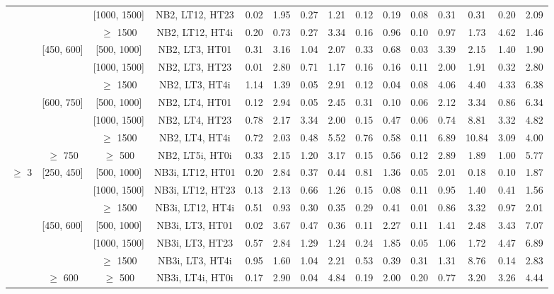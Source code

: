 \begin{table}[ht]
\begin{center}
\begin{tabular}{|c | c | c | c | c | c | c | c | c | c | c | c | c | c | c | }
\cline{3-15}  & & [1000, 1500] &NB2, LT12, HT23 & 0.02 & 1.95 & 0.27 & 1.21 & 0.12 & 0.19 & 0.08 & 0.31 & 0.31 & 0.20 & 2.09 \\ 
\cline{3-15}  & & $\geq$ 1500 &NB2, LT12, HT4i & 0.20 & 0.73 & 0.27 & 3.34 & 0.16 & 0.96 & 0.10 & 0.97 & 1.73 & 4.62 & 1.46 \\ 
\cline{2-15}   & [450, 600] & [500, 1000]&NB2, LT3, HT01 & 0.31 & 3.16 & 1.04 & 2.07 & 0.33 & 0.68 & 0.03 & 3.39 & 2.15 & 1.40 & 1.90 \\ 
\cline{3-15}  & & [1000, 1500] &NB2, LT3, HT23 & 0.01 & 2.80 & 0.71 & 1.17 & 0.16 & 0.16 & 0.11 & 2.00 & 1.91 & 0.32 & 2.80 \\ 
\cline{3-15}  & & $\geq$ 1500 &NB2, LT3, HT4i & 1.14 & 1.39 & 0.05 & 2.91 & 0.12 & 0.04 & 0.08 & 4.06 & 4.40 & 4.33 & 6.38 \\ 
\cline{2-15}   & [600, 750] & [500, 1000]&NB2, LT4, HT01 & 0.12 & 2.94 & 0.05 & 2.45 & 0.31 & 0.10 & 0.06 & 2.12 & 3.34 & 0.86 & 6.34 \\ 
\cline{3-15}  & & [1000, 1500] &NB2, LT4, HT23 & 0.78 & 2.17 & 3.34 & 2.00 & 0.15 & 0.47 & 0.06 & 0.74 & 8.81 & 3.32 & 4.82 \\ 
\cline{3-15}  & & $\geq$ 1500 &NB2, LT4, HT4i & 0.72 & 2.03 & 0.48 & 5.52 & 0.76 & 0.58 & 0.11 & 6.89 & 10.84 & 3.09 & 4.00 \\ 
\cline{2-15}   & $\geq$ 750 & $\geq$ 500&NB2, LT5i, HT0i & 0.33 & 2.15 & 1.20 & 3.17 & 0.15 & 0.56 & 0.12 & 2.89 & 1.89 & 1.00 & 5.77 \\ 
\cline{1-15} $\geq$ 3 & [250, 450] & [500, 1000]&NB3i, LT12, HT01 & 0.20 & 2.84 & 0.37 & 0.44 & 0.81 & 1.36 & 0.05 & 2.01 & 0.18 & 0.10 & 1.87 \\ 
\cline{3-15}  & & [1000, 1500] &NB3i, LT12, HT23 & 0.13 & 2.13 & 0.66 & 1.26 & 0.15 & 0.08 & 0.11 & 0.95 & 1.40 & 0.41 & 1.56 \\ 
\cline{3-15}  & & $\geq$ 1500 &NB3i, LT12, HT4i & 0.51 & 0.93 & 0.30 & 0.35 & 0.29 & 0.41 & 0.01 & 0.86 & 3.32 & 0.97 & 2.01 \\ 
\cline{2-15}   & [450, 600] & [500, 1000]&NB3i, LT3, HT01 & 0.02 & 3.67 & 0.47 & 0.36 & 0.11 & 2.27 & 0.11 & 1.41 & 2.48 & 3.43 & 7.07 \\ 
\cline{3-15}  & & [1000, 1500] &NB3i, LT3, HT23 & 0.57 & 2.84 & 1.29 & 1.24 & 0.24 & 1.85 & 0.05 & 1.06 & 1.72 & 4.47 & 6.89 \\ 
\cline{3-15}  & & $\geq$ 1500 &NB3i, LT3, HT4i & 0.95 & 1.60 & 1.04 & 2.21 & 0.53 & 0.39 & 0.31 & 1.31 & 8.76 & 0.14 & 2.83 \\ 
\cline{2-15}   & $\geq$ 600 & $\geq$ 500&NB3i, LT4i, HT0i & 0.17 & 2.90 & 0.04 & 4.84 & 0.19 & 2.00 & 0.20 & 0.77 & 3.20 & 3.26 & 4.44 \\ 

\end{tabular}
\end{center}
\end{table}
